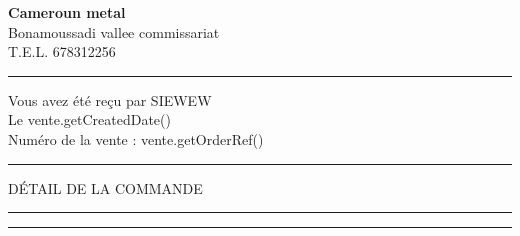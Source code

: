 \documentclass[a4paper,french,10pt]{report}
\def \tab {\hspace*{2ex}} %
\def \tab {\hspace*{2ex}}
\begin{document}
\bfseries
\huge
\begin{center}
\textbf{Cameroun metal}
\vspace{0.2cm}\\
Bonamoussadi vallee commissariat
\vspace{0.2cm}\\
T.E.L. 678312256
\end{center}

\vspace{0.5cm}
\hrule
\vspace{1cm}

Vous avez été reçu par \uppercase{siewew}
\vspace{0.2cm}\\
Le \tab vente.getCreatedDate() 
\vspace{0.2cm}\\
Numéro de la vente : vente.getOrderRef() 

\vspace{0.5cm}
\hrule
\vspace{1cm}

\uppercase{Détail de la commande}\\ 

\vspace{1cm}
\hrule
\vspace{1cm}


\vfill
\hrule %
\end{document}
